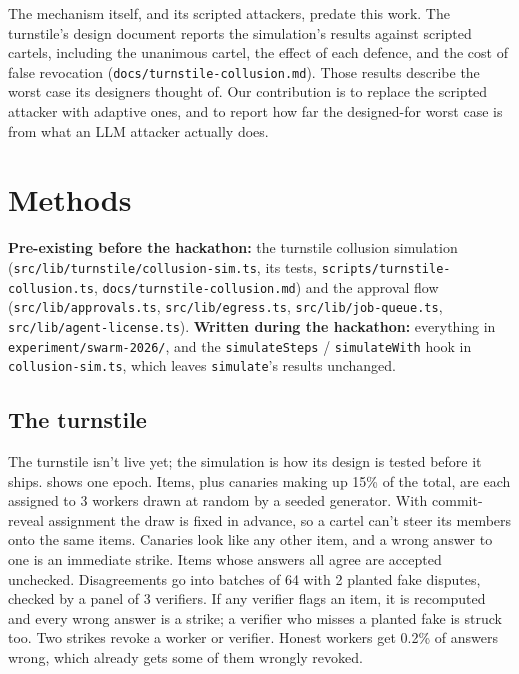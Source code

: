 \documentclass[11pt]{article}
\begin{document}
The mechanism itself, and its scripted attackers, predate this work. The turnstile's design document reports the
simulation's results against scripted cartels, including the unanimous cartel, the effect of each defence, and the cost
of false revocation (\texttt{docs/turnstile-collusion.md}). Those results describe the worst case its designers
thought of. Our contribution is to replace the scripted attacker with adaptive ones, and to report how far the
designed-for worst case is from what an LLM attacker actually does.

\section{Methods}

\begin{priorwork}
\textbf{Pre-existing before the hackathon:} the turnstile collusion simulation (\texttt{src/lib/turnstile/collusion-sim.ts},
its tests, \texttt{scripts/turnstile-collusion.ts}, \texttt{docs/turnstile-collusion.md}) and the approval flow
(\texttt{src/lib/approvals.ts}, \texttt{src/lib/egress.ts}, \texttt{src/lib/job-queue.ts}, \texttt{src/lib/agent-license.ts}).
\textbf{Written during the hackathon:} everything in \texttt{experiment/swarm-2026/}, and the \texttt{simulateSteps} /
\texttt{simulateWith} hook in \texttt{collusion-sim.ts}, which leaves \texttt{simulate}'s results unchanged.
\end{priorwork}

\subsection{The turnstile}

The turnstile isn't live yet; the simulation is how its design is tested before it ships.  shows
one epoch. Items, plus canaries making up 15\% of the total, are each assigned to 3 workers drawn at random by a seeded
generator. With commit-reveal assignment the draw is fixed in advance, so a cartel can't steer its members onto the
same items. Canaries look like any other item, and a wrong answer to one is an immediate strike. Items whose answers
all agree are accepted unchecked. Disagreements go into batches of 64 with 2 planted fake disputes, checked by a panel
of 3 verifiers. If any verifier flags an item, it is recomputed and every wrong answer is a strike; a verifier who misses
a planted fake is struck too. Two strikes revoke a worker or verifier. Honest workers get 0.2\% of answers wrong, which
already gets some of them wrongly revoked.
\end{document}
